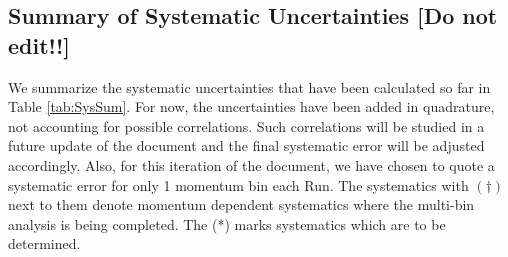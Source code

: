 \subsection{Summary of Systematic Uncertainties [Do not edit!!]}
\label{sec:Systematics_Summary}

We summarize the systematic uncertainties that have been calculated so far in
Table \ref{tab:SysSum}. For now, the uncertainties have been added in quadrature, not
accounting for possible correlations. Such correlations will be studied in a
future update of the document and the final systematic error will be adjusted accordingly. Also, for this iteration of the document, we have chosen to quote a systematic error for only 1 momentum bin each Run. The systematics with $(\dagger)$ next to them denote momentum dependent systematics where the multi-bin analysis is being completed. The (*) marks systematics which are to be determined.

